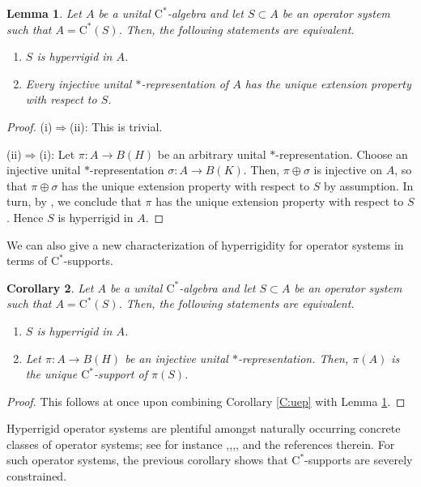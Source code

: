 \documentclass[10pt]{amsart}
\newcommand{\rC}{\mathrm{C}}
\newtheorem{lemma}{Lemma}[section]
\newtheorem{corollary}[lemma]{Corollary}
\theoremstyle{definition}
\begin{document}
\begin{lemma}\label{L:hrisom}
Let $A$ be a  unital $\rC^*$-algebra and let $S\subset A$ be an operator system such that $A=\rC^*(S)$. Then, the following statements are equivalent.
\begin{enumerate}[{\rm (i)}]
\item $S$ is hyperrigid in $A$.
\item Every injective  unital $*$-representation  of $A$  has the unique extension property with respect to $S$.
\end{enumerate}
\end{lemma}
\begin{proof}
(i)$\Rightarrow$(ii): This is trivial.

(ii)$\Rightarrow$(i): Let $\pi:A\to B(H)$ be an arbitrary unital $*$-representation. Choose an injective unital $*$-representation $\sigma:A\to B(K)$. Then, $\pi\oplus \sigma$ is injective on $A$, so that $\pi\oplus \sigma$ has the unique extension property with respect to $S$ by assumption. In turn, by \cite[Lemma 2.8]{CTh2022}, we conclude that $\pi$ has the unique extension property with respect to $S$. Hence $S$ is hyperrigid in $A$.
\end{proof}

We can also give a new characterization of hyperrigidity for operator systems in terms of $\rC^*$-supports.


\begin{corollary}\label{C:hr}
Let $A$ be a  unital $\rC^*$-algebra and let $S\subset A$ be an operator system such that $A=\rC^*(S)$.  Then, the following statements are equivalent.
\begin{enumerate}[{\rm (i)}]
\item $S$ is hyperrigid in $A$.
\item Let $\pi:A\to B(H)$ be an injective unital $*$-representation. Then, $\pi(A)$ is the unique $\rC^*$-support of $\pi(S)$.
\end{enumerate}
\end{corollary}
\begin{proof}
This follows at once upon combining Corollary \ref{C:uep} with Lemma \ref{L:hrisom}.
\end{proof}



Hyperrigid operator systems are plentiful amongst naturally occurring concrete classes of operator systems; see for instance \cite{CH2018},\cite{kim2021},\cite{HK2019},\cite{KR2020},\cite{scherer2024} and the references therein. For such operator systems, the previous corollary shows that $\rC^*$-supports are severely constrained.
\end{document}
